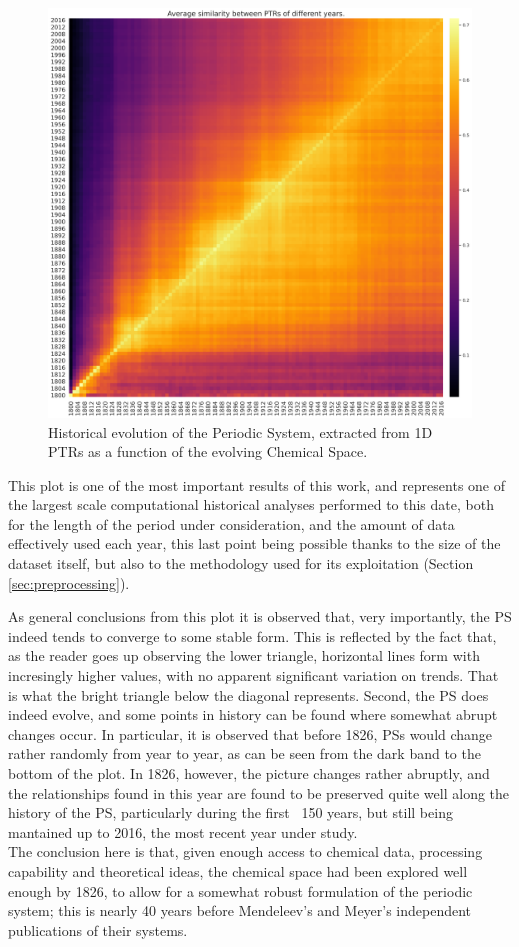 \documentclass[article]{article}
\begin{document}
\begin{figure}[h!]
  \centering
	\includegraphics[width=18.0cm]{history_mat.png}
	\caption{Historical evolution of the Periodic System, extracted from 1D PTRs as a function of the evolving Chemical Space.}
	\label{fig:historicAnal}
\end{figure}

This plot is one of the most important results of this work, and represents one of the largest scale computational historical analyses performed to this date, both for the length of the period under consideration, and the amount of data effectively used each year, this last point being possible thanks to the size of the dataset itself, but also to the methodology used for its exploitation (Section \ref{sec:preprocessing}). 

As general conclusions from this plot it is observed that, very importantly, the PS indeed tends to converge to some stable form. This is reflected by the fact that, as the reader goes up observing the lower triangle, horizontal lines form with incresingly higher values, with no apparent significant variation on trends. That is what the bright triangle below the diagonal represents.
Second, the PS does indeed evolve, and some points in history can be found where somewhat abrupt changes occur. In particular, it is observed that before 1826, PSs would change rather randomly from year to year, as can be seen from the dark band to the bottom of the plot. In 1826, however, the picture changes rather abruptly, and the relationships found in this year are found to be preserved quite well along the history of the PS, particularly during the first ~150 years, but still being mantained up to 2016, the most recent year under study.\\
The conclusion here is that, given enough access to chemical data, processing capability and theoretical ideas, the chemical space had been explored well enough by 1826, to allow for a somewhat robust formulation of the periodic system; this is nearly 40 years before Mendeleev's and Meyer's independent publications of their systems.
\end{document}

